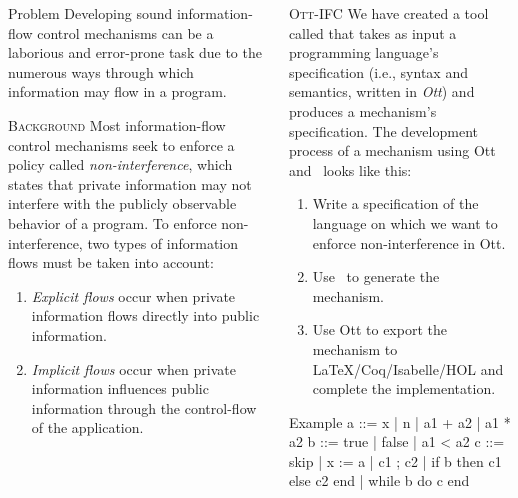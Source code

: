 \documentclass[final]{beamer}
\newlength{\onecolwid}
\newlength{\twocolwid}
\begin{document}
\begin{frame}[fragile]
\begin{columns}[t]
\begin{column}{\onecolwid}
\begin{alertblock}{Problem}
    Developing sound information-flow control mechanisms can be a laborious and error-prone task due to the numerous ways through which information may flow in a program.
\end{alertblock}

\begin{block}{\textsc{Background}}
    Most information-flow control mechanisms seek to enforce a policy called \emph{non-interference}, which states that private information may not interfere with the publicly observable behavior of a program. To enforce non-interference, two types of information flows must be taken into account: 
    \begin{enumerate}
        \item \emph{Explicit flows} occur when private information flows directly into public information. 
        \item \emph{Implicit flows} occur when private information influences public information through the control-flow of the application.
    \end{enumerate}
\end{block}

\end{column}
\begin{column}{\twocolwid}

\begin{block}{\textsc{Ott-IFC}}
We have created a tool called \emph{\ottifc} that takes as input a programming language's specification (i.e., syntax and semantics, written in \emph{Ott}) and produces a mechanism's specification. The development process of a mechanism using Ott and \ottifc\ looks like this:

\noindent
\begin{minipage}[t]{0.48\linewidth}
\begin{enumerate}
\item Write a specification of the language on which we want to enforce non-interference in Ott.
\item Use \ottifc\ to generate the mechanism.
\item Use Ott to export the mechanism to LaTeX/Coq/Isabelle/HOL and complete the implementation.
\end{enumerate}    
\end{minipage}
\hfill%
\begin{minipage}[t]{0.48\linewidth}
\begin{alertblock}{Example}
a ::= x | n | a1 + a2 | a1 * a2 
b ::= true | false | a1 < a2
c ::= skip | x := a | c1 ; c2 | 
        if b then c1 else c2 end | 
        while b do c end   
\end{alertblock}      
\end{minipage}
\end{block}



\end{column}
\end{columns}
\end{frame}
\end{document}
